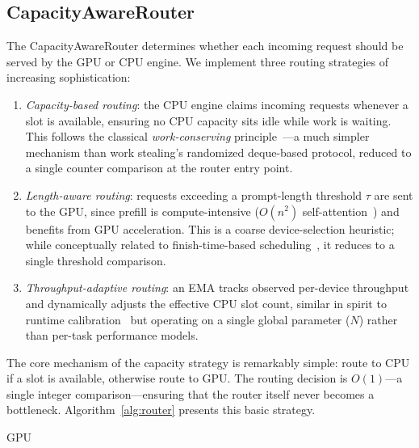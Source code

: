 \documentclass[10pt,conference]{IEEEtran}
\begin{document}
\subsection{CapacityAwareRouter}
\label{sec:router}

The CapacityAwareRouter determines whether each incoming request should be served by the GPU or CPU engine.
We implement three routing strategies of increasing sophistication:

\begin{enumerate}
\item \emph{Capacity-based routing}: the CPU engine claims incoming requests whenever a slot is available, ensuring no CPU capacity sits idle while work is waiting.
This follows the classical \emph{work-conserving} principle~\cite{blumofe1999workstealing}---a much simpler mechanism than work stealing's randomized deque-based protocol, reduced to a single counter comparison at the router entry point.

\item \emph{Length-aware routing}: requests exceeding a prompt-length threshold $\tau$ are sent to the GPU, since prefill is compute-intensive ($O(n^2)$ self-attention~\cite{vaswani2017attention}) and benefits from GPU acceleration.
This is a coarse device-selection heuristic; while conceptually related to finish-time-based scheduling~\cite{topcuoglu2002heft}, it reduces to a single threshold comparison.

\item \emph{Throughput-adaptive routing}: an EMA tracks observed per-device throughput and dynamically adjusts the effective CPU slot count, similar in spirit to runtime calibration~\cite{augonnet2011starpu} but operating on a single global parameter ($N$) rather than per-task performance models.
\end{enumerate}

The core mechanism of the capacity strategy is remarkably simple: route to CPU if a slot is available, otherwise route to GPU.
The routing decision is $O(1)$---a single integer comparison---ensuring that the router itself never becomes a bottleneck.
Algorithm~\ref{alg:router} presents this basic strategy.

\begin{algorithm}[t]
\DontPrintSemicolon
\SetAlgoLined
\caption{CapacityAwareRouter --- Capacity-Based Strategy}
\label{alg:router}
\Return GPU\;
\end{algorithm}
\end{document}
